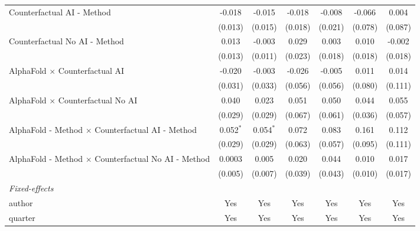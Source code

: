 \begin{tabular}{lcccccc}
   Counterfactual AI - Method                                 & -0.018      & -0.015      & -0.018  & -0.008  & -0.066        & 0.004\\   
                                                              & (0.013)     & (0.015)     & (0.018) & (0.021) & (0.078)       & (0.087)\\   
   Counterfactual No AI - Method                              & 0.013       & -0.003      & 0.029   & 0.003   & 0.010         & -0.002\\   
                                                              & (0.013)     & (0.011)     & (0.023) & (0.018) & (0.018)       & (0.018)\\   
   AlphaFold $\times$ Counterfactual AI                       & -0.020      & -0.003      & -0.026  & -0.005  & 0.011         & 0.014\\   
                                                              & (0.031)     & (0.033)     & (0.056) & (0.056) & (0.080)       & (0.111)\\   
   AlphaFold $\times$ Counterfactual No AI                    & 0.040       & 0.023       & 0.051   & 0.050   & 0.044         & 0.055\\   
                                                              & (0.029)     & (0.029)     & (0.067) & (0.061) & (0.036)       & (0.057)\\   
   AlphaFold - Method $\times$ Counterfactual AI - Method     & 0.052$^{*}$ & 0.054$^{*}$ & 0.072   & 0.083   & 0.161         & 0.112\\   
                                                              & (0.029)     & (0.029)     & (0.063) & (0.057) & (0.095)       & (0.111)\\   
   AlphaFold - Method $\times$ Counterfactual No AI - Method  & 0.0003      & 0.005       & 0.020   & 0.044   & 0.010         & 0.017\\   
                                                              & (0.005)     & (0.007)     & (0.039) & (0.043) & (0.010)       & (0.017)\\   
   \midrule
   \emph{Fixed-effects}\\
   author                                                     & Yes         & Yes         & Yes     & Yes     & Yes           & Yes\\  
   quarter                                                    & Yes         & Yes         & Yes     & Yes     & Yes           & Yes\\  
   \midrule

\end{tabular}
